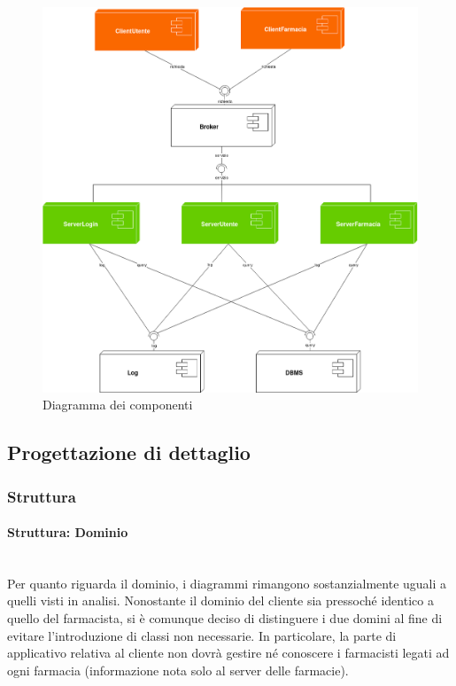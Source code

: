 \begin{figure}[h!]
    \begin{center}
        \includegraphics[width=\textwidth]{immagini/Componenti-progettazione.png}
        \caption{Diagramma dei componenti}
    \end{center}
\end{figure}

\newpage

\subsection{Progettazione di dettaglio}

\subsubsection{Struttura}

\paragraph{Struttura: Dominio}\mbox{}\\

Per quanto riguarda il dominio, i diagrammi rimangono sostanzialmente uguali a quelli visti in analisi.
Nonostante il dominio del cliente sia pressoché identico a quello del farmacista, 
si è comunque deciso di distinguere i due domini al fine di evitare l'introduzione di classi non necessarie.
In particolare, la parte di applicativo relativa al cliente non dovrà gestire né conoscere i farmacisti legati ad ogni farmacia (informazione nota solo al server delle farmacie).

